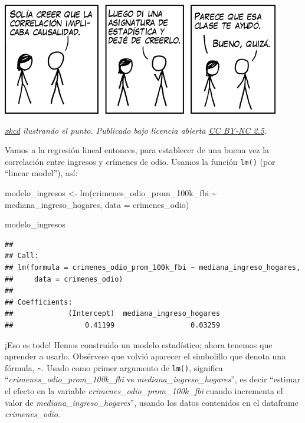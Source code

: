 \documentclass[
]{book}
\newenvironment{Shaded}{\begin{snugshade}}{\end{snugshade}}
\newcommand{\AttributeTok}[1]{\textcolor[rgb]{0.77,0.63,0.00}{#1}}
\newcommand{\FunctionTok}[1]{\textcolor[rgb]{0.00,0.00,0.00}{#1}}
\newcommand{\NormalTok}[1]{#1}
\newcommand{\OtherTok}[1]{\textcolor[rgb]{0.56,0.35,0.01}{#1}}
\newcommand{\SpecialCharTok}[1]{\textcolor[rgb]{0.00,0.00,0.00}{#1}}
\begin{document}
\includegraphics{imagenes/xkcd_correlacion.png}

\emph{\href{https://es.xkcd.com/strips/correlacion/}{xkcd} ilustrando el punto. Publicado bajo licencia abierta \href{https://creativecommons.org/licenses/by-nc/2.5/deed.es}{CC BY-NC 2.5}.}

Vamos a la regresión lineal entonces, para establecer de una buena vez la correlación entre ingresos y crímenes de odio. Usamos la función \texttt{lm()} (por ``linear model''), así:

\begin{Shaded}
\begin{Highlighting}[]
\NormalTok{modelo\_ingresos }\OtherTok{\textless{}{-}} \FunctionTok{lm}\NormalTok{(crimenes\_odio\_prom\_100k\_fbi }\SpecialCharTok{\textasciitilde{}}\NormalTok{ mediana\_ingreso\_hogares, }
                      \AttributeTok{data =}\NormalTok{ crimenes\_odio)}

\NormalTok{modelo\_ingresos}
\end{Highlighting}
\end{Shaded}

\begin{verbatim}
## 
## Call:
## lm(formula = crimenes_odio_prom_100k_fbi ~ mediana_ingreso_hogares, 
##     data = crimenes_odio)
## 
## Coefficients:
##             (Intercept)  mediana_ingreso_hogares  
##                 0.41199                  0.03259
\end{verbatim}

¡Eso es todo! Hemos construido un modelo estadístico; ahora tenemos que aprender a usarlo. Obsérvese que volvió aparecer el simbolillo que denota una fórmula, \texttt{\textasciitilde{}}. Usado como primer argumento de \texttt{lm()}, significa ``\emph{crimenes\_odio\_prom\_100k\_fbi} vs \emph{mediana\_ingreso\_hogares}'', es decir ``estimar el efecto en la variable \emph{crimenes\_odio\_prom\_100k\_fbi} cuando incrementa el valor de \emph{mediana\_ingreso\_hogares}'', usando los datos contenidos en el dataframe \emph{crimenes\_odio}.
\end{document}
